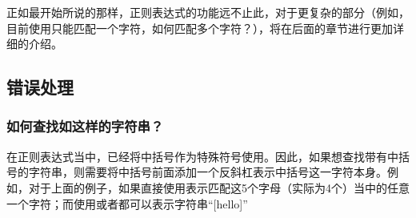 正如最开始所说的那样，正则表达式的功能远不止此，对于更复杂的部分（例如，目前使用\code{[]}只能匹配一个字符，如何匹配多个字符？），将在后面的章节进行更加详细的介绍。

\subsection{错误处理}\label{subsec:初窥正则表达式-错误处理}

\subsubsection{如何查找如\code{[hello]}这样的字符串？}

在正则表达式当中，已经将中括号作为特殊符号使用。因此，如果想查找带有中括号的字符串，则需要将中括号前面添加一个反斜杠\code{$\backslash$}表示中括号这一字符本身。例如，对于上面的例子，如果直接使用\code{[hello]}表示匹配这5个字母（实际为4个）当中的任意一个字符；而使用或者\code{$\backslash$[hello]}都可以表示字符串“[hello]”